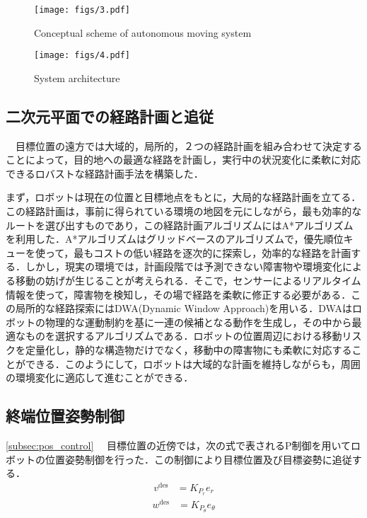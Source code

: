 \begin{figure}[!t]
\texttt{[image: figs/3.pdf]}
\caption{Conceptual scheme of autonomous moving system}
\label{fig:fig3}
\end{figure}

\begin{figure}[!t]
\texttt{[image: figs/4.pdf]}
\caption{System architecture}
\label{fig:fig4}
\end{figure}

\subsection{二次元平面での経路計画と追従}
　目標位置の遠方では大域的，局所的，２つの経路計画を組み合わせて決定することによって，目的地への最適な経路を計画し，実行中の状況変化に柔軟に対応できるロバストな経路計画手法を構築した．

まず，ロボットは現在の位置と目標地点をもとに，大局的な経路計画を立てる．この経路計画は，事前に得られている環境の地図を元にしながら，最も効率的なルートを選び出すものであり，この経路計画アルゴリズムにはA*アルゴリズム\cite{Astar}を利用した．A*アルゴリズムはグリッドベースのアルゴリズムで，優先順位キューを使って，最もコストの低い経路を逐次的に探索し，効率的な経路を計画する．しかし，現実の環境では，計画段階では予測できない障害物や環境変化による移動の妨げが生じることが考えられる．そこで，センサーによるリアルタイム情報を使って，障害物を検知し，その場で経路を柔軟に修正する必要がある．この局所的な経路探索にはDWA(Dynamic Window Approach)\cite{DWA}を用いる．DWAはロボットの物理的な運動制約を基に一連の候補となる動作を生成し，その中から最適なものを選択するアルゴリズムである．ロボットの位置周辺における移動リスクを定量化し，静的な構造物だけでなく，移動中の障害物にも柔軟に対応することができる．このようにして，ロボットは大域的な計画を維持しながらも，周囲の環境変化に適応して進むことができる．


\subsection{終端位置姿勢制御}\ref{subsec:pos_control}
　目標位置の近傍では，次の式で表されるP制御を用いてロボットの位置姿勢制御を行った．この制御により目標位置及び目標姿勢に追従する．
\begin{align}
v^{\text{des}} &= K_{P_{r}} e_{r}
\end{align}
\begin{align}
w^{\text{des}} &= K_{P_{θ}} e_{θ}
\end{align}

